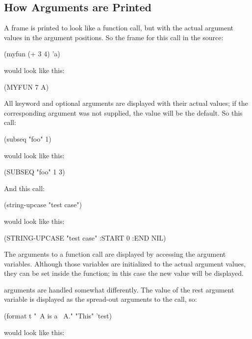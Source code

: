 \subsection{How Arguments are Printed}

A frame is printed to look like a function call, but with the actual argument
values in the argument positions.  So the frame for this call in the source:

\begin{lisp}
(myfun (+ 3 4) 'a)
\end{lisp}

would look like this:

\begin{example}
(MYFUN 7 A)
\end{example}

All keyword and optional arguments are displayed with their actual
values; if the corresponding argument was not supplied, the value will
be the default.  So this call:

\begin{lisp}
(subseq "foo" 1)
\end{lisp}

would look like this:

\begin{example}
(SUBSEQ "foo" 1 3)
\end{example}

And this call:

\begin{lisp}
(string-upcase "test case")
\end{lisp}

would look like this:

\begin{example}
(STRING-UPCASE "test case" :START 0 :END NIL)
\end{example}

The arguments to a function call are displayed by accessing the argument
variables.  Although those variables are initialized to the actual argument
values, they can be set inside the function; in this case the new value will be
displayed.

\code{\amprest} arguments are handled somewhat differently.  The value of
the rest argument variable is displayed as the spread-out arguments to
the call, so:

\begin{lisp}
(format t "~A is a ~A." "This" 'test)
\end{lisp}

would look like this:

